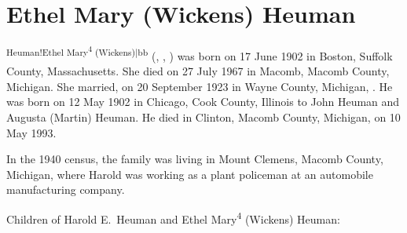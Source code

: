 \section{Ethel Mary (Wickens) Heuman}\label{per:Ethel4Wickens}

\textsuperscript{Heuman!Ethel Mary\textsuperscript{4} (Wickens)|bb} (, , ) was born on 17 June 1902 in Boston, Suffolk County, Massachusetts.\cite{Ethel4WickensBirth} She died on 27 July 1967 in Macomb, Macomb County, Michigan.\cite{Ethel4WickensDeath} She married, on 20 September 1923 in Wayne County, Michigan, .\cite{Ethel4WickensMarriage} He was born on 12 May 1902 in Chicago, Cook County, Illinois\cite{HaroldHeumanDeath,HaroldHeumanDraft} to John Heuman and Augusta (Martin) Heuman.\cite{Census1910HaroldHeuman,GraceHeumanBirth} He died in Clinton, Macomb County, Michigan, on 10 May 1993.\cite{HaroldHeumanDeath}

In the 1940 census, the family was living in Mount Clemens, Macomb County, Michigan, where Harold was working as a plant policeman at an automobile manufacturing company.\cite{Census1940HaroldHeuman}

\begin{KidsIntro}
	Children of Harold E.\ Heuman and Ethel Mary\textsuperscript{4} (Wickens) Heuman:
\end{KidsIntro}

\begin{Kids}
	
	
\end{Kids}